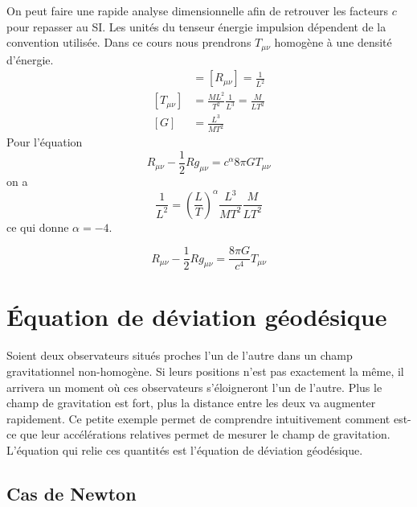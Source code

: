 \documentclass[a4paper,11pt]{report}
\begin{document}
            On peut faire une rapide analyse dimensionnelle afin de retrouver les facteurs $c$ pour repasser au SI. Les unités du tenseur énergie impulsion dépendent de la convention utilisée. Dans ce cours nous prendrons $T_{\mu\nu}$ homogène à une densité d'énergie.
            \begin{align}
                [R] &= [R_{\mu\nu}] = \frac{1}{L^2}\\
                [T_{\mu\nu}] &= \frac{ML^2}{T^2}\frac{1}{L^3} = \frac{M}{LT^2}\\
                [G] &= \frac{L^3}{MT^2}
            \end{align}
            Pour l'équation
            \begin{equation}
                R_{\mu\nu}-\frac{1}{2}Rg_{\mu\nu} = c^\alpha 8\pi G T_{\mu\nu}
            \end{equation}
            on a
            \begin{equation}
                \frac{1}{L^2} = \left(\frac{L}{T}\right)^\alpha \frac{L^3}{MT^2}\frac{M}{LT^2}
            \end{equation}
            ce qui donne $\alpha = -4$.
            
            \begin{equation}
                \boxed{R_{\mu\nu}-\frac{1}{2}Rg_{\mu\nu} = \frac{8\pi G}{c^4} T_{\mu\nu}}
            \end{equation}
            
    \section{Équation de déviation géodésique}
        
        Soient deux observateurs situés proches l'un de l'autre dans un champ gravitationnel non-homogène. Si leurs positions n'est pas exactement la même, il arrivera un moment où ces observateurs s'éloigneront l'un de l'autre. Plus le champ de gravitation est fort, plus la distance entre les deux va augmenter rapidement. Ce petite exemple permet de comprendre intuitivement comment est-ce que leur accélérations relatives permet de mesurer le champ de gravitation. L'équation qui relie ces quantités est l'équation de déviation géodésique.\\
        
        \subsection{Cas de Newton}
        
\end{document}
